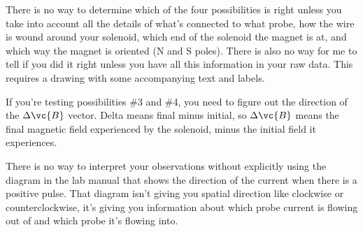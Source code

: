 There is no way to determine which of the four possibilities is right
unless you take into account all the details of what's connected to
what probe, how the wire is wound around your solenoid, which end of
the solenoid the magnet is at, and which way the magnet is oriented (N
and S poles). There is also no way for me to tell if you did it right
unless you have all this information in your raw data. This requires a
drawing with some accompanying text and labels.

If you're testing possibilities \#3 and \#4, you need to figure out the
direction of the $\Delta\vc{B}$ vector. Delta means final minus initial, so
$\Delta\vc{B}$ means the final magnetic field experienced by the solenoid, minus
the initial field it experiences.

There is no way	to interpret your observations without explicitly
using the diagram in the lab manual that shows the direction of the
current when there is a	positive pulse. That diagram isn't giving you
spatial	direction like clockwise or counterclockwise, it's giving you
information about which	probe current is flowing out of	and which
probe it's flowing into.

